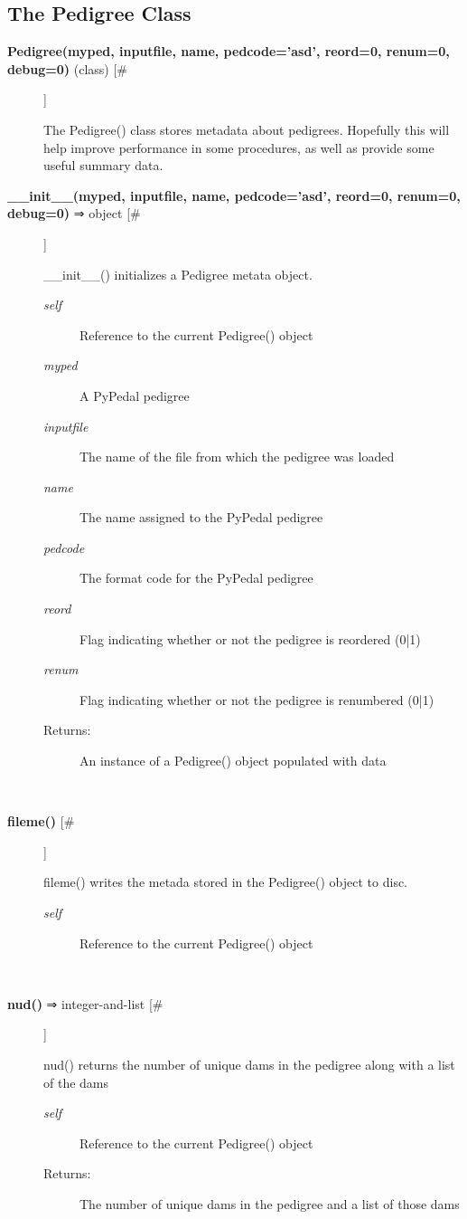 \documentclass{article}
\begin{document}
\subsection*{The Pedigree Class}
\begin{description}
\item[\textbf{Pedigree(myped, inputfile, name, pedcode='asd', reord=0, renum=0, debug=0)} (class) [\#]
]
\par The Pedigree() class stores metadata about pedigrees.  Hopefully this will help improve performance in some procedures,
as well as provide some useful summary data.

\item[\textbf{\_\_init\_\_(myped, inputfile, name, pedcode='asd', reord=0, renum=0, debug=0)} ⇒ object [\#]
]
\par \_\_init\_\_() initializes a Pedigree metata object.
\begin{description}
\item[\textit{self}
]
Reference to the current Pedigree() object
\item[\textit{myped}
]
A PyPedal pedigree
\item[\textit{inputfile}
]
The name of the file from which the pedigree was loaded
\item[\textit{name}
]
The name assigned to the PyPedal pedigree
\item[\textit{pedcode}
]
The format code for the PyPedal pedigree
\item[\textit{reord}
]
Flag indicating whether or not the pedigree is reordered (0|1)
\item[\textit{renum}
]
Flag indicating whether or not the pedigree is renumbered (0|1)
\item[Returns:
]
An instance of a Pedigree() object populated with data
\end{description}\\

\item[\textbf{fileme()} [\#]
]
\par fileme() writes the metada stored in the Pedigree() object to disc.
\begin{description}
\item[\textit{self}
]
Reference to the current Pedigree() object
\end{description}\\

\item[\textbf{nud()} ⇒ integer-and-list [\#]
]
\par nud() returns the number of unique dams in the pedigree along with a list of the dams
\begin{description}
\item[\textit{self}
]
Reference to the current Pedigree() object
\item[Returns:
]
The number of unique dams in the pedigree and a list of those dams
\end{description}\\


\end{description}
\end{document}
